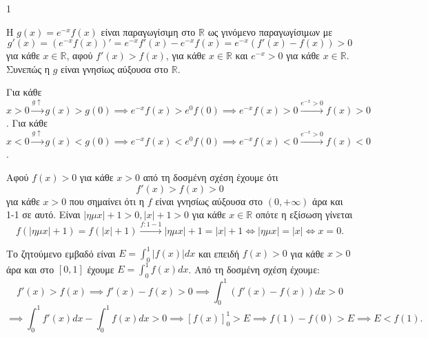 \begin{ylh}{1}
    \item [Ύλη από εικόνα]
\end{ylh}
\begin{alist}
\item Η $g(x)=e^{-x}f(x)$ είναι παραγωγίσιμη στο $\mathbb{R}$ ως γινόμενο παραγωγίσιμων με
\[ g'(x)=(e^{-x}f(x))' = e^{-x}f'(x)-e^{-x}f(x) = e^{-x}(f'(x)-f(x)) > 0 \]
για κάθε $x \in \mathbb{R}$, αφού $f'(x)>f(x)$, για κάθε $x\in\mathbb{R}$ και $e^{-x}>0$ για κάθε $x\in\mathbb{R}$.
Συνεπώς η $g$ είναι γνησίως αύξουσα στο $\mathbb{R}$. \monades{}
\item Για κάθε $x>0 \xrightarrow{g \uparrow} g(x) > g(0) \implies e^{-x}f(x) > e^0f(0) \implies e^{-x}f(x)>0 \xrightarrow{e^{-x}>0} f(x)>0$.
Για κάθε $x<0 \xrightarrow{g \uparrow} g(x) < g(0) \implies e^{-x}f(x) < e^0f(0) \implies e^{-x}f(x)<0 \xrightarrow{e^{-x}>0} f(x)<0$. \monades{}
\item Αφού $f(x)>0$ για κάθε $x>0$ από τη δοσμένη σχέση έχουμε ότι
\[ f'(x)>f(x)>0 \]
για κάθε $x>0$ που σημαίνει ότι η $f$ είναι γνησίως αύξουσα στο $(0,+\infty)$ άρα και 1-1 σε αυτό.
Είναι $|\eta\mu x|+1>0, |x|+1>0$ για κάθε $x\in\mathbb{R}$ οπότε η εξίσωση γίνεται
\[ f(|\eta\mu x|+1) = f(|x|+1) \xrightarrow{f:1-1} |\eta\mu x|+1 = |x|+1 \iff |\eta\mu x| = |x| \iff x=0. \] \monades{}
\item Το ζητούμενο εμβαδό είναι $E = \int_{0}^{1} |f(x)|dx$ και επειδή $f(x)>0$ για κάθε $x>0$
άρα και στο $[0,1]$ έχουμε $E = \int_{0}^{1} f(x)dx$. Από τη δοσμένη σχέση έχουμε:
\[ f'(x)>f(x) \implies f'(x)-f(x)>0 \implies \int_{0}^{1} (f'(x)-f(x))dx > 0 \]
\[ \implies \int_{0}^{1} f'(x)dx - \int_{0}^{1} f(x)dx > 0 \implies \left[f(x)\right]_0^1 > E \implies f(1)-f(0) > E \implies E < f(1). \] \monades{}
\end{alist}
